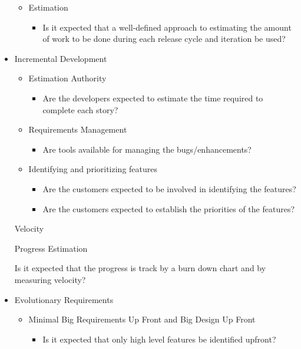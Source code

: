 \begin{appendices}
\begin{itemize}
\begin{itemize}
			\item Estimation
				\begin{itemize}
					\item Is it expected that a well-defined approach to estimating the amount of work to be done during each release cycle and iteration be used?
				\end{itemize}
		\end{itemize}
	\item Incremental Development
		\begin{itemize}
			\item Estimation Authority
				\begin{itemize}
					\item Are the developers expected to estimate the time required to complete each story?
				\end{itemize}
			\item Requirements Management
				\begin{itemize}
					\item Are tools available for managing the bugs/enhancements?
				\end{itemize}
			\item Identifying and prioritizing features
				\begin{itemize}
					\item Are the customers expected to be involved in identifying the features?
					\item Are the customers expected to establish the priorities of the features?
				\end{itemize}
		\end{itemize}
	\addition Velocity
		\begin{itemize}
			\addition Progress Estimation
				\begin{itemize}
					\addition Is it expected that the progress is track by a burn down chart and by measuring velocity?
				\end{itemize}
		\end{itemize}
	\item Evolutionary Requirements
		\begin{itemize}
			\item Minimal Big Requirements Up Front and Big Design Up Front
				\begin{itemize}
					\item Is it expected that only high level features be identified upfront?

\end{itemize}
\end{itemize}
\end{itemize}
\end{appendices}
